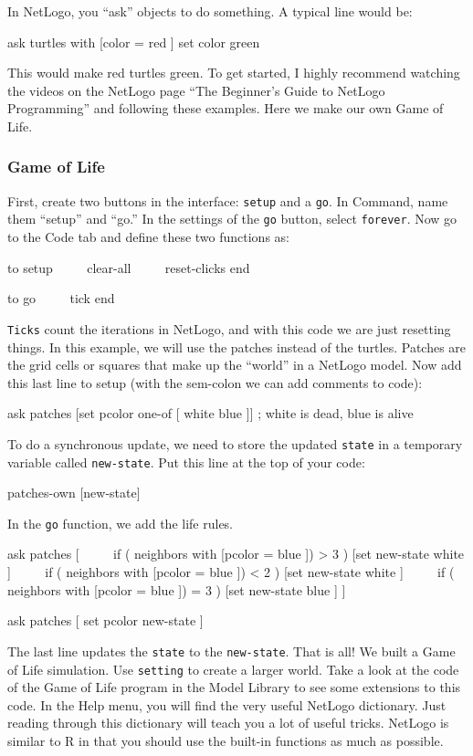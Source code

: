 \documentclass[
  a4paper,
  DIV=11,
  numbers=noendperiod,
  oneside]{scrreprt}
\begin{document}
In NetLogo, you ``ask'' objects to do something. A typical line would
be:

{ask} {turtles with} {{[}}{color =} {red} {]} {set} {color} {green}

This would make red turtles green. To get started, I highly recommend
watching the videos on the NetLogo page ``The Beginner's Guide to
NetLogo Programming'' and following these examples. Here we make our own
Game of Life.

\subsubsection{Game of Life}\label{sec-Game-of-Life}

First, create two buttons in the interface: \texttt{setup} and a
\texttt{go}. In Command, name them ``setup'' and ``go.'' In the settings
of the \texttt{go} button, select \texttt{forever}. Now go to the Code
tab and define these two functions as:

{to} {setup} ~~~~ {clear-all} ~~~~ {reset-clicks} {end}

{to} {go} ~~~~ {tick} {end}

\texttt{Ticks} count the iterations in NetLogo, and with this code we
are just resetting things. In this example, we will use the patches
instead of the turtles. Patches are the grid cells or squares that make
up the ``world'' in a NetLogo model. Now add this last line to setup
(with the sem-colon we can add comments to code):

{ask} {patches} {{[}}{set} {pcolor one-of} {{[}} {white blue} {]}{]} {;
white is dead, blue is alive}

To do a synchronous update, we need to store the updated \texttt{state}
in a temporary variable called \texttt{new-state}. Put this line at the
top of your code:

{patches-own} {{[}new-state{]}}

In the \texttt{go} function, we add the life rules.

{ask} {patches} {{[}} ~~~~ {if} {(} {neighbors with} {{[}}{pcolor =}
{blue} {]}) {\textgreater{}} {3} {)} {{[}}{set} {new-state} {white} {]}
~~~~ {if} {(} {neighbors with} {{[}}{pcolor =} {blue} {]}) {\textless{}}
{2} {)} {{[}}{set} {new-state} {white} {]} ~~~~ {if} {(} {neighbors
with} {{[}}{pcolor =} {blue} {]}) {=} {3} {)} {{[}}{set} {new-state}
{blue} {]} {{]}}

{ask} {patches} {[} {}{set} {pcolor} {new-state} {]}

The last line updates the \texttt{state} to the \texttt{new-state}. That
is all! We built a Game of Life simulation. Use \texttt{setting} to
create a larger world. Take a look at the code of the Game of Life
program in the Model Library to see some extensions to this code. In the
Help menu, you will find the very useful NetLogo dictionary. Just
reading through this dictionary will teach you a lot of useful tricks.
NetLogo is similar to R in that you should use the built-in functions as
much as possible.
\end{document}
